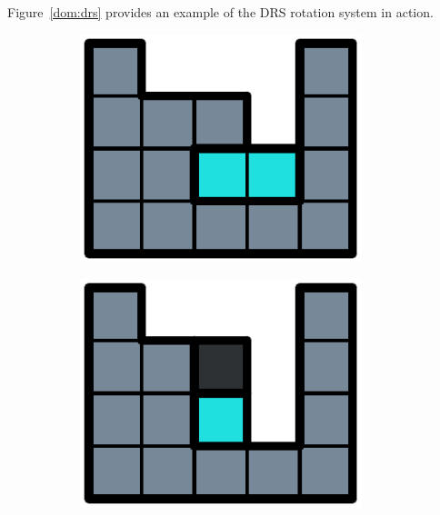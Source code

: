 Figure~\ref{dom:drs} provides an example of the DRS rotation system in action.

\begin{figure}[ht]
  \centering
  \begin{subfigure}[b]{0.15\textwidth}
    \centering
    \includegraphics[width=0.9\textwidth]{pictures/dominoes/drs-1.pdf}
    \caption{}
  \end{subfigure}
  \begin{subfigure}[b]{0.15\textwidth}
    \centering
    \includegraphics[width=0.9\textwidth]{pictures/dominoes/drs-2.pdf}
    \caption{}
  \end{subfigure}
  \begin{subfigure}[b]{0.15\textwidth}
    \centering

\end{subfigure}
\end{figure}
